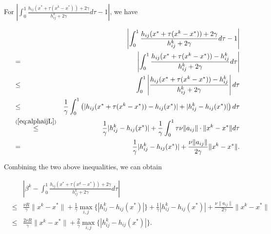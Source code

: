 \documentclass[10pt]{article}
\newcommand{\newalpha}{h}
\begin{document}
For $\left| \int_{0}^1 \frac{\newalpha_{ij}(x^* + \tau(x^k - x^*)) + 2\gamma}{ h_{ij}^k + 2\gamma} d\tau - 1   \right|$, we have 

\begin{eqnarray*}
	&& \left| \int_{0}^1 \frac{\newalpha_{ij}(x^* + \tau(x^k - x^*)) + 2\gamma}{ h_{ij}^k + 2\gamma} d\tau - 1   \right| \\ 
	&=& \left|  \int_{0}^1  \frac{\newalpha_{ij}(x^* + \tau(x^k - x^*)) - h_{ij}^k}{ h_{ij}^k + 2\gamma} d\tau  \right| \\ 
	&\leq& \int_{0}^1 \left|   \frac{\newalpha_{ij}(x^* + \tau(x^k - x^*)) - h_{ij}^k}{ h_{ij}^k + 2\gamma}  \right| d\tau \\ 
	&\leq& \frac{1}{\gamma} \int_{0}^1 \left(  |\newalpha_{ij}(x^* + \tau(x^k - x^*)) - \newalpha_{ij}(x^*)| + |h_{ij}^k - \newalpha_{ij}(x^*)|  \right) d\tau \\ 
	&\overset{(\ref{eq:alphaijL})}{\leq}& \frac{1}{\gamma} |h_{ij}^k - \newalpha_{ij}(x^*)| + \frac{1}{\gamma} \int_{0}^1 \tau \nu \|a_{ij}\| \cdot \|x^k - x^*\| d\tau \\ 
	&=& \frac{1}{\gamma} |h_{ij}^k - \newalpha_{ij}(x^*)|  + \frac{\nu \|a_{ij}\|}{2\gamma} \|x^k - x^*\|. 
\end{eqnarray*}

Combining the two above inequalities, we can obtain 

\begin{eqnarray}
&& \left|   \beta^k - \int_{0}^1 \frac{\newalpha_{ij}(x^* + \tau(x^k - x^*)) + 2\gamma}{ h_{ij}^k + 2\gamma} d\tau   \right| \nonumber \\ 
&\leq& \frac{\nu R}{\gamma} \|x^k - x^*\| + \frac{1}{\gamma} \max_{i, j} \{|h_{ij}^k - \newalpha_{ij}(x^*)| \} + \frac{1}{\gamma} |h_{ij}^k - \newalpha_{ij}(x^*)|  + \frac{\nu \|a_{ij}\|}{2\gamma} \|x^k - x^*\| \nonumber \\ 
&\leq&  \frac{2\nu R}{\gamma} \|x^k - x^*\| + \frac{2}{\gamma} \max_{i, j} \{|h_{ij}^k - \newalpha_{ij}(x^*)| \}. \label{eq:betak-2}
\end{eqnarray}
\end{document}
